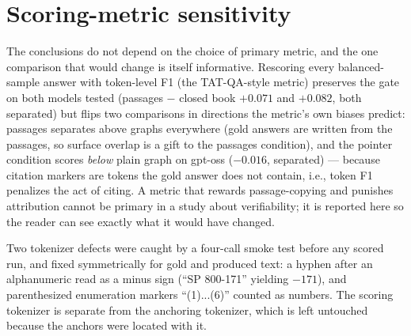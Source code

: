 \documentclass{article}
\begin{document}
\section{Scoring-metric sensitivity}\label{app:metrics}

The conclusions do not depend on the choice of primary metric, and the
one comparison that would change is itself informative. Rescoring every balanced-sample answer
with token-level F1 (the TAT-QA-style metric) preserves the gate on both
models tested (passages $-$ closed book $+0.071$ and $+0.082$, both
separated) but flips two comparisons in directions the metric's own biases
predict: passages separates above graphs everywhere (gold answers are
written from the passages, so surface overlap is a gift to the passages
condition), and the pointer condition scores \emph{below} plain graph on
gpt-oss ($-0.016$, separated) --- because citation markers are tokens the
gold answer does not contain, i.e., token F1 penalizes the act of citing.
A metric that rewards passage-copying and punishes attribution cannot be
primary in a study about verifiability; it is reported here so the reader
can see exactly what it would have changed.

Two tokenizer defects were caught by a four-call smoke test before any
scored run, and fixed symmetrically for gold and produced text: a hyphen
after an alphanumeric read as a minus sign (``SP 800-171'' yielding
$-171$), and parenthesized enumeration markers ``(1)...(6)'' counted as
numbers. The scoring tokenizer is separate from the anchoring tokenizer,
which is left untouched because the anchors were located with it.
\end{document}
